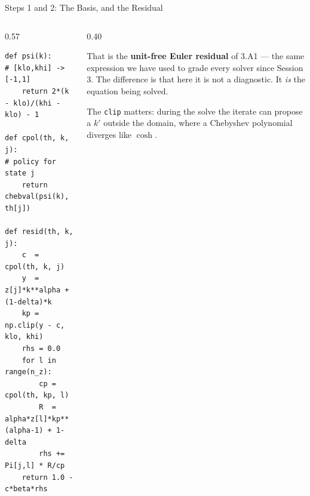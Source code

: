 \begin{frame}[fragile]{Steps 1 and 2: The Basis, and the Residual}
\begin{columns}[T]
\begin{column}{0.57\textwidth}
\begin{lstlisting}
def psi(k):                       # [klo,khi] -> [-1,1]
    return 2*(k - klo)/(khi - klo) - 1

def cpol(th, k, j):               # policy for state j
    return chebval(psi(k), th[j])

def resid(th, k, j):
    c  = cpol(th, k, j)
    y  = z[j]*k**alpha + (1-delta)*k
    kp = np.clip(y - c, klo, khi)
    rhs = 0.0
    for l in range(n_z):
        cp = cpol(th, kp, l)
        R  = alpha*z[l]*kp**(alpha-1) + 1-delta
        rhs += Pi[j,l] * R/cp
    return 1.0 - c*beta*rhs
\end{lstlisting}
\end{column}
\begin{column}{0.40\textwidth}
\begin{conceptbox}[title=\textbf{Read the last line}]\small
That is the \textbf{unit-free Euler residual} of 3.A1 --- the same expression we have used to grade every solver since Session 3.
\medskip
The difference is that here it is not a diagnostic. It \emph{is} the equation being solved.
\end{conceptbox}
\medskip
\begin{cautionbox}\footnotesize
The \texttt{clip} matters: during the solve the iterate can propose a $k'$ outside the domain, where a Chebyshev polynomial diverges like $\cosh$.
\end{cautionbox}
\end{column}
\end{columns}
\end{frame}

